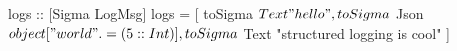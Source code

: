 \begin{code}
logs :: [Sigma LogMsg]
logs =
  [ toSigma $ Text "hello"
  , toSigma $ Json $
      object
        [ "world" .= (5 :: Int) ]
  , toSigma $ Text "structured logging is cool"
  ]
\end{code}
